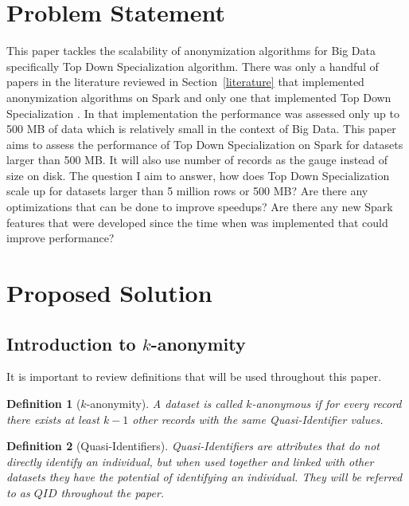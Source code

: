 \documentclass[11pt]{article}       %
\newtheorem{definition}{Definition}
\begin{document}
\section{Problem Statement} \label{problem}

This paper tackles the scalability of anonymization algorithms for Big Data specifically Top Down Specialization algorithm. There was only a handful of papers in the literature reviewed in Section~\ref{literature} that implemented anonymization algorithms on Spark and only one that implemented Top Down Specialization \cite{Sopaoglu:2017}. In that implementation the performance was assessed only up to 500 MB of data which is relatively small in the context of Big Data. This paper aims to assess the performance of Top Down Specialization on Spark for datasets larger than 500 MB. It will also use number of records as the gauge instead of size on disk. The question I aim to answer, how does Top Down Specialization scale up for datasets larger than 5 million rows or 500 MB? Are there any optimizations that can be done to improve speedups? Are there any new Spark features that were developed since the time when \cite{Sopaoglu:2017} was implemented that could improve performance?

\section{Proposed Solution} \label{solution}

\subsection{Introduction to $k$-anonymity}

It is important to review definitions that will be used throughout this paper.

\begin{definition}[$k$-anonymity]
A dataset is called $k$-anonymous if for every record there exists at least \(k-1\) other records with the same Quasi-Identifier values. 
\end{definition}

\begin{definition}[Quasi-Identifiers]
Quasi-Identifiers are attributes that do not directly identify an individual, but when used together and linked with other datasets they have the potential of identifying an individual. They will be referred to as $QID$ throughout the paper.
\end{definition}
\end{document}

